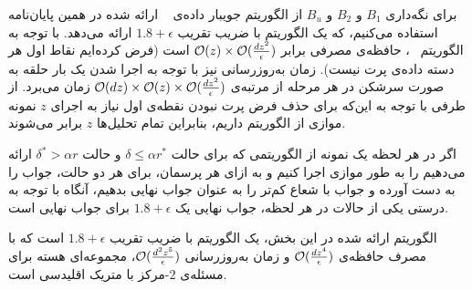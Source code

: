 برای نگه‌داری $B_1$ و $B_2$ و $B_u$ از الگوریتم جویبار داده‌ی ~ ارائه شده در همین پایان‌نامه استفاده می‌کنیم، که یک الگوریتم با ضریب تقریب $1.8 + \epsilon$ ارائه می‌دهد.
با توجه به الگوریتم ~، حافظه‌ی مصرفی برابر $\mathcal{O}(z) \times \mathcal{O}(\frac{dz^2}{\epsilon})$ است (فرض کرده‌ایم نقاط اول هر دسته داده‌ی پرت نیست).
زمان به‌روزرسانی نیز با توجه به اجرا شدن یک بار حلقه به صورت سرشکن در هر مرحله از مرتبه‌ی 
$\mathcal{O}(dz) \times \mathcal{O}(z) \times \mathcal{O}(\frac{dz^2}{\epsilon})$
 زمان می‌برد.
از طرفی با توجه به این‌که برای حذف فرض پرت نبودن نقطه‌ی اول نیاز به اجرای $z$ نمونه موازی از الگوریتم داریم، بنابراین تمام تحلیل‌ها $z$ برابر می‌شوند.



اگر در هر لحظه یک نمونه از الگوریتمی که برای حالت $\delta \leq \alpha r^*$ و حالت $\delta^* > \alpha r$ ارائه می‌دهیم را به طور موازی اجرا کنیم و به ازای هر پرسمان، برای هر دو حالت، جواب را به دست آورده و جواب با شعاع کم‌تر را به عنوان جواب نهایی بدهیم، آنگاه با توجه به درستی یکی از حالات در هر لحظه، جواب نهایی یک $1.8 + \epsilon$ برای جواب نهایی است.


الگوریتم ارائه شده در این بخش، یک الگوریتم با ضریب تقریب $1.8 + \epsilon$ است که با مصرف حافظه‌ی $\mathcal{O}(\frac{dz^4}{\epsilon})$ و زمان به‌روزرسانی $\mathcal{O}(\frac{d^2z^5}{\epsilon})$، مجموعه‌ای هسته برای مسئله‌ی $2$-مرکز با متریک اقلیدسی است.


